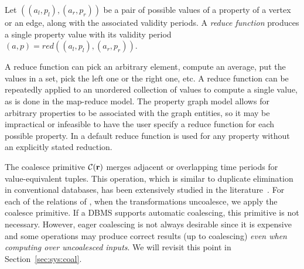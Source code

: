 \begin{definition}
Let $((a_l,p_l),(a_r,p_r))$ be a pair of possible values of a property
of a vertex or an edge, along with the associated validity periods.  A
{\em reduce function} produces a single property value with its
validity period $(a,p) = red((a_l,p_l), (a_r,p_r))$.
\end{definition}

A reduce function can pick an arbitrary element, compute an average,
put the values in a set, pick the left one or the right one, etc.  A
reduce function can be repeatedly applied to an unordered collection
of values to compute a single value, as is done in the map-reduce
model.  The property graph model allows for arbitrary properties to be
associated with the graph entities, so it may be impractical or
infeasible to have the user specify a reduce function for each
possible property.  In \ql a default reduce function  is
used for any property without an explicitly stated reduction.



The coalesce primitive $\mathcal{C}(\mathbf{r})$ merges adjacent or overlapping time
periods for value-equivalent tuples.  This operation, which is similar
to duplicate elimination in conventional databases, has been
extensively studied in the
literature~\cite{DBLP:conf/vldb/BohlenSS96,DBLP:journals/sigmod/Zimanyi06}.
For each of the relations of \tve, when the transformations
uncoalesce, we apply the coalesce primitive.  If a DBMS supports
automatic coalescing, this primitive is not necessary.  However, eager
coalescing is not always desirable since it is expensive and some
operations may produce correct results (up to coalescing) {\em even
  when computing over uncoalesced inputs}.  We will revisit this point in
Section~\ref{sec:sys:coal}.

